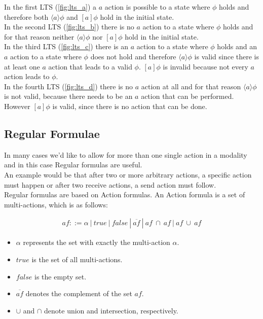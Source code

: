 \documentclass{clseminar}
\begin{document}
  In the first LTS (\autoref{fig:lts_a}) a $a$ action is possible to a state where $\phi$ holds and therefore both $\langle{}a\rangle{}\phi$ and $[a]\phi$ hold in the initial state. \\
  In the second LTS (\autoref{fig:lts_b}) there is no $a$ action to a state where $\phi$ holds and for that reason neither $\langle{}a\rangle{}\phi$ nor $[a]\phi$ hold in the initial state. \\
  In the third LTS (\autoref{fig:lts_c}) there is an $a$ action to a state where $\phi$ holds and an $a$ action to a state where $\phi$ does not hold and therefore $\langle{}a\rangle{}\phi$ is valid since there is at least one $a$ action that leads to a valid $\phi$. $[a]\phi$ is invalid because not every $a$ action leads to $\phi$. \\
  In the fourth LTS (\autoref{fig:lts_d}) there is no $a$ action at all and for that reason $\langle{}a\rangle{}\phi$ is not valid, because there needs to be an $a$ action that can be performed. However $[a]\phi$ is valid, since there is no action that can be done.

  \subsection{Regular Formulae}

  In many cases we'd like to allow for more than one single action in a modality and in this case Regular formulas are useful. \\
  An example would be that after two or more arbitrary actions, a specific action must happen or after two receive actions, a send action must follow. \\
  Regular formulas are based on Action formulas. An Action formula is a set of multi-actions, which is as follows:

  \pagebreak
  \begin{align*}
    \mathit{af} ::= \alpha\ |\ \mathit{true}\ |\ \mathit{false}\ |\ \overline{\mathit{af}}\ |\ \mathit{af}\ \cap\ \mathit{af}\ |\ \mathit{af}\ \cup\ \mathit{af}
  \end{align*}

  \begin{itemize}
    \item $\alpha$ represents the set with exactly the multi-action $\alpha$.
    \item $\mathit{true}$ is the set of all multi-actions.
    \item $\mathit{false}$ is the empty set.
    \item $\overline{\mathit{af}}$ denotes the complement of the set $\mathit{af}$.
    \item $\cup$ and $\cap$ denote union and intersection, respectively.
  \end{itemize}
\end{document}
